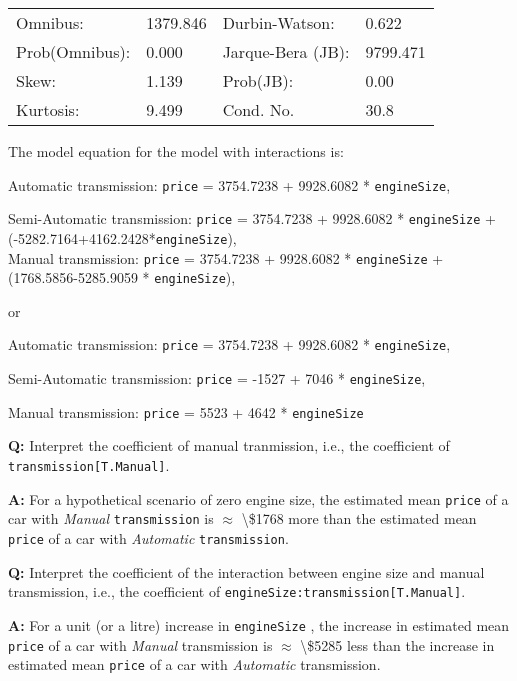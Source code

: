 \documentclass[
  letterpaper,
  DIV=11,
  numbers=noendperiod]{scrreprt}
\begin{document}
\begin{longtable}[]{@{}llll@{}}
\toprule\noalign{}
\endhead
\bottomrule\noalign{}
\endlastfoot
Omnibus: & 1379.846 & Durbin-Watson: & 0.622 \\
Prob(Omnibus): & 0.000 & Jarque-Bera (JB): & 9799.471 \\
Skew: & 1.139 & Prob(JB): & 0.00 \\
Kurtosis: & 9.499 & Cond. No. & 30.8 \\
\end{longtable}

The model equation for the model with interactions is:

Automatic transmission: \texttt{price} = 3754.7238 + 9928.6082 *
\texttt{engineSize},

Semi-Automatic transmission: \texttt{price} = 3754.7238 + 9928.6082 *
\texttt{engineSize} + (-5282.7164+4162.2428*\texttt{engineSize}),\\

Manual transmission: \texttt{price} = 3754.7238 + 9928.6082 *
\texttt{engineSize} +(1768.5856-5285.9059 * \texttt{engineSize}),

or

Automatic transmission: \texttt{price} = 3754.7238 + 9928.6082 *
\texttt{engineSize},

Semi-Automatic transmission: \texttt{price} = -1527 + 7046 *
\texttt{engineSize},

Manual transmission: \texttt{price} = 5523 + 4642 * \texttt{engineSize}

\textbf{Q:} Interpret the coefficient of manual tranmission, i.e., the
coefficient of \texttt{transmission{[}T.Manual{]}}.

\textbf{A:} For a hypothetical scenario of zero engine size, the
estimated mean \texttt{price} of a car with \emph{Manual}
\texttt{transmission} is \(\approx\) \textbackslash\$1768 more than the
estimated mean \texttt{price} of a car with \emph{Automatic}
\texttt{transmission}.

\textbf{Q:} Interpret the coefficient of the interaction between engine
size and manual transmission, i.e., the coefficient of
\texttt{engineSize:transmission{[}T.Manual{]}}.

\textbf{A:} For a unit (or a litre) increase in \texttt{engineSize} ,
the increase in estimated mean \texttt{price} of a car with
\emph{Manual} transmission is \(\approx\) \textbackslash\$5285 less than
the increase in estimated mean \texttt{price} of a car with
\emph{Automatic} transmission.
\end{document}
